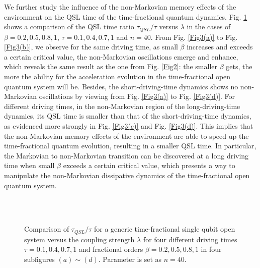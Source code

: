 \documentclass[
showpacs,  %
showkeys,  %
aps,       %
amsthm,    %
amsmath,   %
amsfonts,  %
amssymb    %
]{revtex4-1}          %
\begin{document}
We further study the influence of the non-Markovian memory effects of the environment on the QSL time of the time-fractional quantum dynamics. Fig. \ref{Fig3} shows a comparison of the QSL time ratio ${\tau _{QSL}}/{\tau}$ versus $\lambda$ in the cases of $\beta=0.2, 0.5, 0.8, 1$, $\tau=0.1, 0.4, 0.7, 1$ and $n=40$. From Fig. \ref{Fig3(a)} to Fig. \ref{Fig3(b)}, we observe for the same driving time, as small $\beta$ increases and exceeds a certain critical value, the non-Markovian oscillations emerge and enhance, which reveals the same result as the one from Fig. \ref{Fig2}: the smaller $\beta$ gets, the more the ability for the acceleration evolution in the time-fractional open quantum system will be. Besides, the short-driving-time dynamics shows no non-Markovian oscillations by viewing from Fig. \ref{Fig3(a)} to Fig. \ref{Fig3(d)}. For different driving times, in the non-Markovian region of the long-driving-time dynamics, its QSL time is smaller than that of the short-driving-time dynamics, as evidenced more strongly in Fig. \ref{Fig3(c)} and Fig. \ref{Fig3(d)}. This implies that the non-Markovian memory effects of the environment are able to speed up the time-fractional quantum evolution, resulting in a smaller QSL time. In particular, the Markovian to non-Markovian transition can be discovered at a long driving time when small $\beta$ exceeds a certain critical value, which presents a way to manipulate the non-Markovian dissipative dynamics of the time-fractional open quantum system.
\begin{figure}[htbp]
\vspace{0.5cm}
\subfigtopskip=2pt
\subfigbottomskip=5pt
\subfigcapskip=-5pt
\centering
{}
    \quad
{}\\
    \quad
{}\\
\caption{Comparison of ${\tau _{QSL}}/{\tau}$ for a generic time-fractional single qubit open system versus the coupling strength $\lambda$ for four different driving times $\tau=0.1, 0.4, 0.7, 1$ and fractional orders $\beta=0.2, 0.5, 0.8, 1$ in four subfigures $(a)\sim(d)$. Parameter is set as $n=40$.}
\label{Fig3}
\end{figure}
\end{document}
